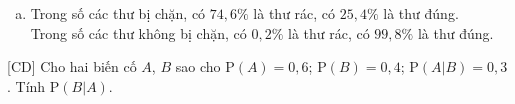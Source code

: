 \begin{bt}
{\begin{enumerate}[a)]
	Áp dụng công thức Bayes
	$$P(\overline{A}\mid \overline{B}) = \dfrac{P(\overline{A})\cdot P(\overline{B}\mid \overline{A})}{P(\overline{A})\cdot P(\overline{B}\mid \overline{A}) + P(A)\cdot P(\overline{B} \mid A)}.$$
	\begin{itemize}
		\item Tính $P(\overline{B} \mid A)$: Ta có $(\overline{B} \mid A)=1-P(B \mid A)=0{,}05$.
		\item Tính $P(\overline{B} \mid \overline{A})$: Ta có $P(\overline{B} \mid \overline{A})=1-P(B \mid \overline{A})=0{,}99$.
	\end{itemize}
	Vậy $P(\overline{A}\mid \overline{B}) = \dfrac{P(\overline{A})\cdot P(\overline{B}\mid \overline{A})}{P(\overline{A})\cdot P(\overline{B}\mid \overline{A}) + P(A)\cdot P(\overline{B} \mid A)}=\dfrac{0{,}97\cdot 0{,}99}{0{,}97\cdot 0{,}99+0{,}03\cdot 0{,}05}=\dfrac{3201}{3206}\approx 0{,}998$.\\
	Vậy xác suất để chọn ngẫu nhiên một thư không bị chặn mà thư đó là thư đúng là khoảng $0{,}998$.
	\item Trong số các thư bị chặn, có $74{,}6 \%$ là thư rác, có $25{,}4 \%$ là thư đúng. \\
	Trong số các thư không bị chặn, có $0{,}2 \%$ là thư rác, có $99{,}8 \%$ là thư đúng.
	\end{enumerate}
}

\end{bt}

\begin{bt}%
[CD]%
	Cho hai biến cố $A$, $B$ sao cho $\mathrm{P}(A) = 0{,}6$; $\mathrm{P}(B)=0{,}4$; $\mathrm{P}(A|B) = 0{,}3$. Tính $\mathrm{P}(B|A)$.
\end{bt}

